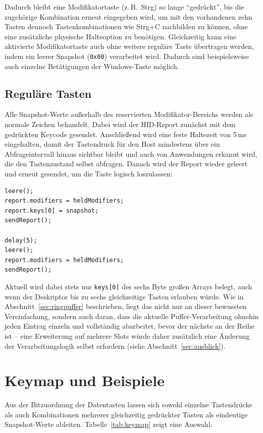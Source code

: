 \documentclass{article}
\begin{document}
Dadurch bleibt eine Modifikatortaste (z.\,B.\ Strg) so lange \enquote{gedrückt}, bis die zugehörige Kombination erneut eingegeben wird, um mit den vorhandenen zehn Tasten dennoch Tastenkombinationen wie Strg+C nachbilden zu können, ohne eine zusätzliche physische Halteoption zu benötigen. Gleichzeitig kann eine aktivierte Modifikatortaste auch ohne weitere reguläre Taste übertragen werden, indem ein leerer Snapshot (\texttt{0x00}) verarbeitet wird. Dadurch sind beispielsweise auch einzelne Betätigungen der Windows-Taste möglich.

\subsection{Reguläre Tasten}
\label{sec:regulaer}
Alle Snapshot-Werte außerhalb des reservierten Modifikator-Bereichs werden als normale Zeichen behandelt. Dabei wird der HID-Report zunächst mit dem gedrückten Keycode gesendet. Anschließend wird eine feste Haltezeit von 5\,ms eingehalten, damit der Tastendruck für den Host mindestens über ein Abfrageintervall hinaus sichtbar bleibt und auch von Anwendungen erkannt wird, die den Tastenzustand selbst abfragen. Danach wird der Report wieder geleert und erneut gesendet, um die Taste logisch loszulassen:

\begin{lstlisting}[style=arduino]
leere();
report.modifiers = heldModifiers;
report.keys[0] = snapshot;
sendReport();

delay(5);
leere();
report.modifiers = heldModifiers;
sendReport();
\end{lstlisting}

Aktuell wird dabei stets nur \texttt{keys[0]} des sechs Byte großen Arrays belegt, auch wenn der Deskriptor bis zu sechs gleichzeitige Tasten erlauben würde. Wie in Abschnitt~\ref{sec:ringpuffer} beschrieben, liegt das nicht nur an dieser bewussten Vereinfachung, sondern auch daran, dass die aktuelle Puffer-Verarbeitung ohnehin jeden Eintrag einzeln und vollständig abarbeitet, bevor der nächste an der Reihe ist -- eine Erweiterung auf mehrere Slots würde daher zusätzlich eine Änderung der Verarbeitungslogik selbst erfordern (siehe Abschnitt~\ref{sec:ausblick}).

\section{Keymap und Beispiele}
\label{sec:keymap}
Aus der Bitzuordnung der Datentasten lassen sich sowohl einzelne Tastendrücke als auch Kombinationen mehrerer gleichzeitig gedrückter Tasten als eindeutige Snapshot-Werte ableiten. Tabelle~\ref{tab:keymap} zeigt eine Auswahl:
\end{document}
